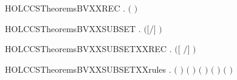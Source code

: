 \newcommand{\HOLCCSTheoremsBNXXind}{\UseVerbatim{HOLCCSTheoremsBNXXind}}
\begin{SaveVerbatim}{HOLCCSTheoremsBVXXREC}
\HOLTokenTurnstile{} \HOLSymConst{\HOLTokenForall{}} .  \HOLConst{\HOLTokenIn{}}  \ensuremath{(}  \ensuremath{)}
\end{SaveVerbatim}
\newcommand{\HOLCCSTheoremsBVXXREC}{\UseVerbatim{HOLCCSTheoremsBVXXREC}}
\begin{SaveVerbatim}{HOLCCSTheoremsBVXXSUBSET}
\HOLTokenTurnstile{} \HOLSymConst{\HOLTokenForall{}}  .  \ensuremath{(}\ensuremath{[}\ensuremath{/}\ensuremath{]} \ensuremath{)} \HOLConst{\HOLTokenSubset{}}   \HOLConst{\HOLTokenUnion{}}  
\end{SaveVerbatim}
\newcommand{\HOLCCSTheoremsBVXXSUBSET}{\UseVerbatim{HOLCCSTheoremsBVXXSUBSET}}
\begin{SaveVerbatim}{HOLCCSTheoremsBVXXSUBSETXXREC}
\HOLTokenTurnstile{} \HOLSymConst{\HOLTokenForall{}} .  \ensuremath{(}\ensuremath{[}  \ensuremath{/}\ensuremath{]} \ensuremath{)} \HOLConst{\HOLTokenSubset{}}    
\end{SaveVerbatim}
\newcommand{\HOLCCSTheoremsBVXXSUBSETXXREC}{\UseVerbatim{HOLCCSTheoremsBVXXSUBSETXXREC}}
\begin{SaveVerbatim}{HOLCCSTheoremsBVXXSUBSETXXrules}
\HOLTokenTurnstile{} \HOLSymConst{\HOLTokenForall{}}  .
         \HOLConst{\HOLTokenSubset{}}  \ensuremath{(}  \ensuremath{)} \HOLSymConst{\HOLTokenConj{}}   \HOLConst{\HOLTokenSubset{}}  \ensuremath{(} \HOLSymConst{\ensuremath{+}} \ensuremath{)} \HOLSymConst{\HOLTokenConj{}}
         \HOLConst{\HOLTokenSubset{}}  \ensuremath{(} \HOLSymConst{\ensuremath{+}} \ensuremath{)} \HOLSymConst{\HOLTokenConj{}}   \HOLConst{\HOLTokenSubset{}}  \ensuremath{(} \HOLSymConst{\ensuremath{\mid}} \ensuremath{)} \HOLSymConst{\HOLTokenConj{}}
         \HOLConst{\HOLTokenSubset{}}  \ensuremath{(} \HOLSymConst{\ensuremath{\mid}} \ensuremath{)}
\end{SaveVerbatim}
